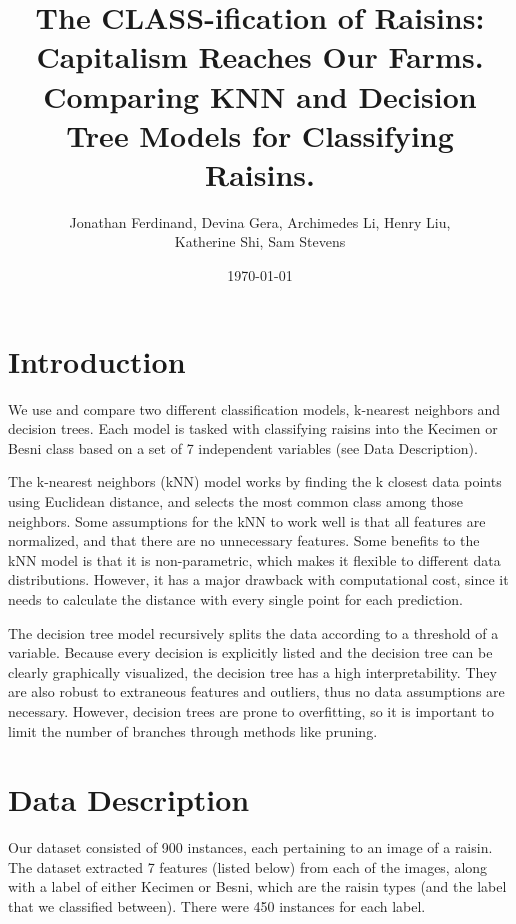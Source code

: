 \documentclass{article}
\title{The CLASS-ification of Raisins: Capitalism Reaches Our Farms. \\
\large Comparing KNN and Decision Tree Models for Classifying Raisins.}
\author{Jonathan Ferdinand, Devina Gera, Archimedes Li, Henry Liu, \\Katherine Shi, Sam Stevens}
\date{\today}
\begin{document}
\maketitle

\section*{Introduction}

We use and compare two different classification models, k-nearest neighbors and decision trees.  Each model is tasked with classifying raisins into the Kecimen or Besni class based on a set of 7 independent variables (see Data Description).

\vspace{5mm}

\noindent The k-nearest neighbors (kNN) model works by finding the k closest data points using Euclidean distance, and selects the most common class among those neighbors.  Some assumptions for the kNN to work well is that all features are normalized, and that there are no unnecessary features.  Some benefits to the kNN model is that it is non-parametric, which makes it flexible to different data distributions.  However, it has a major drawback with computational cost, since it needs to calculate the distance with every single point for each prediction.

\vspace{5mm}

\noindent The decision tree model recursively splits the data according to a threshold of a variable.  Because every decision is explicitly listed and the decision tree can be clearly graphically visualized, the decision tree has a high interpretability.  They are also robust to extraneous features and outliers, thus no data assumptions are necessary.  However, decision trees are prone to overfitting, so it is important to limit the number of branches through methods like pruning.


\section*{Data Description}
Our dataset consisted of 900 instances, each pertaining to an image of a raisin. The dataset extracted 7 features (listed below) from each of the images, along with a label of either Kecimen or Besni, which are the raisin types (and the label that we classified between). There were 450 instances for each label.
\end{document}
